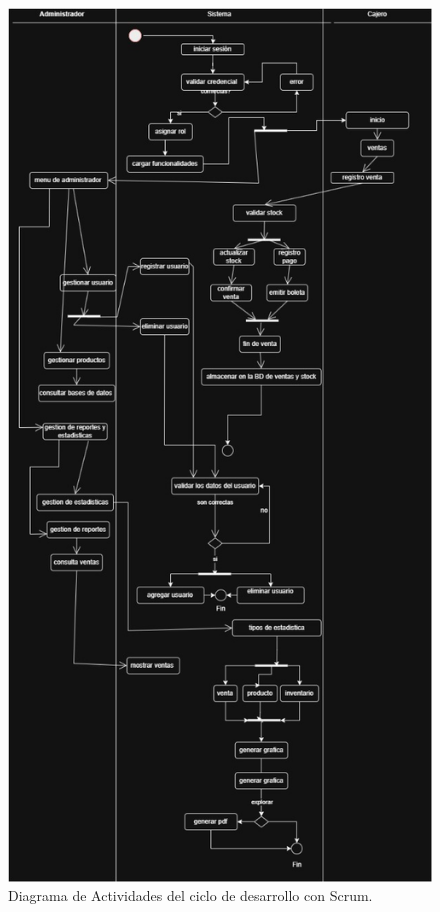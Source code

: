 \documentclass[conference]{IEEEtran}
\begin{document}
\begin{figure}[htbp]
\centerline{\includegraphics[width=0.9\columnwidth]{images/diagrama_actividades.jpg}}
\caption{Diagrama de Actividades del ciclo de desarrollo con Scrum.}
\label{fig:actividades}
\end{figure}
\end{document}
